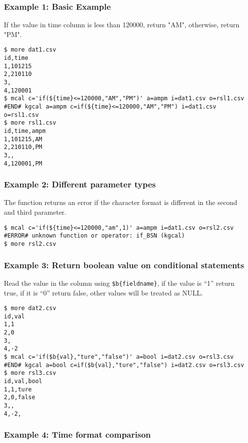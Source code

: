 \subsubsection*{Example 1: Basic Example}

If the value in time column is less than 120000, return "AM", otherwise, return "PM".


\begin{Verbatim}[baselinestretch=0.7,frame=single]
$ more dat1.csv
id,time
1,101215
2,210110
3,
4,120001
$ mcal c='if(${time}<=120000,"AM","PM")' a=ampm i=dat1.csv o=rsl1.csv
#END# kgcal a=ampm c=if(${time}<=120000,"AM","PM") i=dat1.csv o=rsl1.csv
$ more rsl1.csv
id,time,ampm
1,101215,AM
2,210110,PM
3,,
4,120001,PM
\end{Verbatim}
\subsubsection*{Example 2: Different parameter types}

The function returns an error if the character format is different in the second and third parameter.


\begin{Verbatim}[baselinestretch=0.7,frame=single]
$ mcal c='if(${time}<=120000,"am",1)' a=ampm i=dat1.csv o=rsl2.csv
#ERROR# unknown function or operator: if_BSN (kgcal)
$ more rsl2.csv
\end{Verbatim}
\subsubsection*{Example 3: Return boolean value on conditional statements}

Read the value in the column using \verb|$b{fieldname}|, if the value is “1” return true, if it is “0” return false, other values will be treated as NULL.


\begin{Verbatim}[baselinestretch=0.7,frame=single]
$ more dat2.csv
id,val
1,1
2,0
3,
4,-2
$ mcal c='if($b{val},"ture","false")' a=bool i=dat2.csv o=rsl3.csv
#END# kgcal a=bool c=if($b{val},"ture","false") i=dat2.csv o=rsl3.csv
$ more rsl3.csv
id,val,bool
1,1,ture
2,0,false
3,,
4,-2,
\end{Verbatim}
\subsubsection*{Example 4: Time format comparison}



